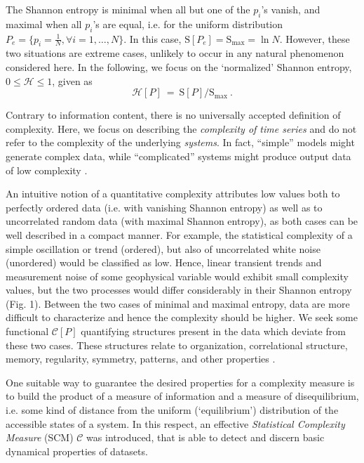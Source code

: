 The Shannon entropy is minimal when all but one of the $p_i$'s vanish, and maximal when all $p_i$'s are equal, i.e. for the uniform distribution $P_e = \{ p_i = \frac{1}{N}, \forall i=1, \ldots , N \}$. In this case, 
${\mathrm S}[P_e] = {\mathrm S}_{\max} = \ln N$. However, these two situations are extreme cases, unlikely to occur in any natural phenomenon considered here. 
In the following, we focus on the `normalized' Shannon entropy, $0 \leq {\mathcal H} \leq 1$, given as
\begin{equation}
\label{shannon-disc-normalizada}
{\mathcal H} [P]~=~{\mathrm S}[P]  / {\mathrm S}_{\max} \ .
\end{equation}

Contrary to information content, there is no universally accepted definition of complexity. Here, we focus on describing the \textit{complexity of time series} and do not refer to the complexity of the underlying \textit{systems}. In fact, “simple” models might generate complex data, while “complicated” systems might produce output data of low complexity \cite{Kantz1998}.  %

An intuitive notion of a quantitative complexity attributes low values both to perfectly ordered data (i.e. with vanishing Shannon entropy) as well as to uncorrelated random data (with maximal Shannon entropy), as both cases can be well described in a compact manner. For example, the statistical complexity of a simple oscillation or trend (ordered), but also of uncorrelated white noise (unordered) would be classified as low. Hence, linear transient trends and measurement noise of some geophysical variable would exhibit small complexity values, but the two processes would differ considerably in their Shannon entropy (Fig. 1). Between the two cases of minimal and maximal entropy, data are more difficult to characterize and hence the complexity should be higher. We seek some functional ${\mathcal C} [P]$ quantifying structures present in the data which deviate from these two cases. These structures relate to organization, correlational structure, memory, regularity, symmetry, patterns, and other properties \cite{Feldman2008}.

One suitable way to guarantee the desired properties for a complexity measure is to build the product of a measure of information and a measure of
disequilibrium, i.e. some kind of distance from the uniform (`equilibrium') distribution of the accessible states of 
a system. In this respect, \cite{Lamberti2004} an effective {\it Statistical Complexity 
	Measure\/} (SCM) ${\mathcal C}$ was introduced, that is able to detect and discern basic dynamical properties of datasets.

